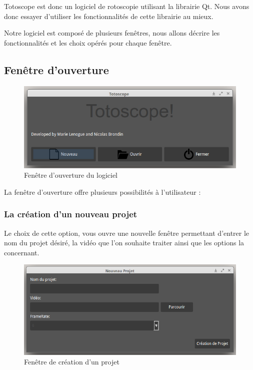 
Totoscope est donc un logiciel de rotoscopie utilisant la librairie Qt. Nous avons donc essayer d'utiliser les fonctionnalités de cette librairie au mieux.

Notre logiciel est composé de plusieurs fenêtres, nous allons  décrire les fonctionnalités et les choix opérés pour chaque fenêtre.

\subsection{Fenêtre d'ouverture}

	\begin{figure}[!h]
		\centering
		\includegraphics[scale=0.5]{./figures/opening.png}
		\caption{Fenêtre d'ouverture du logiciel}
	\end{figure}

	La fenêtre d'ouverture offre plusieurs possibilités à l'utilisateur : 
	
	\subsubsection*{La création d'un nouveau projet}
			Le choix de cette option, vous ouvre une nouvelle fenêtre permettant d'entrer le nom du projet désiré, la vidéo que l'on souhaite traiter ainsi que les options la concernant.
			
			\vspace{0,5cm}
			
	\begin{figure}[h]
		\centering
		\includegraphics[scale=0.5]{./figures/new.png}
		\caption{Fenêtre de création d'un projet}
	\end{figure}	
	
